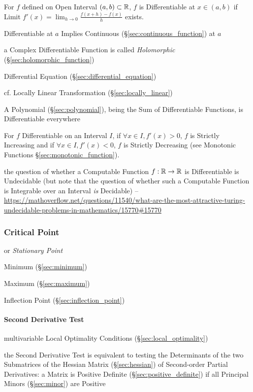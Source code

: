 {For $f$ defined on Open Interval $(a,b) \subset \mathbb{R}$, $f$ is
Differentiable at $x \in (a,b)$ if Limit $f'(x) = \lim_{h \rightarrow
  0} \frac{f (x+h) - f(x)}{h}$ exists.

Differentiable at $a$ Implies Continuous (\S\ref{sec:continuous_function}) at
$a$

a Complex Differentiable Function is called \emph{Holomorphic}
(\S\ref{sec:holomorphic_function})

\fist Differential Equation (\S\ref{sec:differential_equation})

\fist cf. Locally Linear Transformation (\S\ref{sec:locally_linear})

A Polynomial (\S\ref{sec:polynomial}), being the Sum of Differentiable
Functions, is Differentiable everywhere

For $f$ Differentiable on an Interval $I$, if $\forall x \in I, f'(x)
> 0$, $f$ is Strictly Increasing and if $\forall x \in I, f'(x) < 0$,
$f$ is Strictly Decreasing (see Monotonic Functions
\S\ref{sec:monotonic_function}).

the question of whether a Computable Function $f : \mathbb{R} \to \mathbb{R}$ is
Differentiable is Undecidable (but note that the question of whether such a
Computable Function is Integrable over an Interval \emph{is} Decidable)
--\url{https://mathoverflow.net/questions/11540/what-are-the-most-attractive-turing-undecidable-problems-in-mathematics/15770#15770}



\subsubsection{Critical Point}\label{sec:critical_point}

or \emph{Stationary Point}

Minimum (\S\ref{sec:minimum})

Maximum (\S\ref{sec:maximum})

Inflection Point (\S\ref{sec:inflection_point})



\paragraph{Second Derivative Test}\label{sec:second_derivative_test}\hfill

\fist multivariable Local Optimality Conditions (\S\ref{sec:local_optimality})

the Second Derivative Test is equivalent to testing the Determinants of the two
Submatrices of the Hessian Matrix (\S\ref{sec:hessian}) of Second-order
Partial Derivatives: a Matrix is Positive Definite
(\S\ref{sec:positive_definite}) if all Principal Minors (\S\ref{sec:minor}) are
Positive



}

